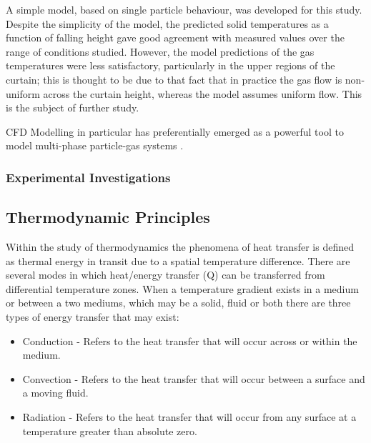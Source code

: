 \documentclass[12pt]{article}
\newcommand{\ts}{\textsuperscript}
\newcommand{\mycite}[1]{\ts{\cite{#1}}}
\begin{document}
A simple model,
based on single particle behaviour, was developed for this study.
Despite the simplicity of the model, the predicted solid temperatures
as a function of falling height gave good agreement with measured
values over the range of conditions studied. However, the model
predictions of the gas temperatures were less satisfactory, particularly
in the upper regions of the curtain; this is thought to be due to that
fact that in practice the gas flow is non-uniform across the curtain
height, whereas the model assumes uniform flow. This is the subject of
further study. \mycite{wardjiman2009heat} \mycite{fundementalsParticleTransport}



CFD Modelling in particular has preferentially emerged as a powerful tool to model multi-phase particle-gas systems \mycite{AfsharCurtainPhd}.


\subsubsection{Experimental Investigations}


\subsection{Thermodynamic Principles} 


Within the study of thermodynamics the phenomena of heat transfer is defined as thermal energy in transit due to a spatial temperature difference\mycite{bergman2011fundamentals}.
There are several modes in which heat/energy transfer (Q) can be transferred from differential temperature zones. When a temperature gradient exists in a medium or between a two mediums, which may be a solid, fluid or both there are three types of energy transfer that may exist: 
\begin{itemize}
	\item Conduction - Refers to the heat transfer that will occur across or within the medium. 
	\item Convection - Refers to the heat transfer that will occur between a surface and a moving fluid. 
	\item Radiation - Refers to the heat transfer that will occur from any surface at a temperature greater than absolute zero. 
\end{itemize}
\end{document}
